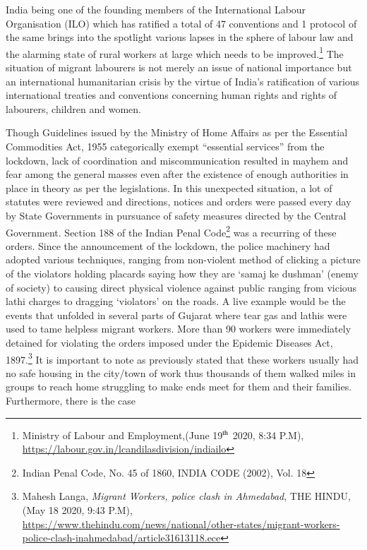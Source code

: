 \begin{multicols}{2}
\noi
India being one of the founding members of the International Labour Organisation (ILO)
which has ratified a total of 47 conventions and 1 protocol of the same brings into the
spotlight various lapses in the sphere of labour law and the alarming state of rural workers at
large which needs to be improved.\footnote{Ministry of Labour and Employment,(June 19$^{\rm th}$ 2020, 8:34 P.M), \url{https://labour.gov.in/lcandilasdivision/indiailo}} The situation of migrant labourers is not merely an issue
of national importance but an international humanitarian crisis by the virtue of India’s
ratification of various international treaties and conventions concerning human rights and
rights of labourers, children and women.

\noi
Though Guidelines issued by the Ministry of Home Affairs as per the Essential Commodities
Act, 1955 categorically exempt “essential services” from the lockdown, lack of coordination
and miscommunication resulted in mayhem and fear among the general masses even after the
existence of enough authorities in place in theory as per the legislations. In this unexpected
situation, a lot of statutes were reviewed and directions, notices and orders were passed every
day by State Governments in pursuance of safety measures directed by the Central Government. Section 188 of the Indian Penal Code\footnote{Indian Penal Code, No. 45 of 1860, INDIA CODE (2002), Vol. 18} was a recurring of these orders. Since
the announcement of the lockdown, the police machinery had adopted various techniques,
ranging from non-violent method of clicking a picture of the violators holding placards
saying how they are ‘samaj ke dushman’ (enemy of society) to causing direct physical
violence against public ranging from vicious lathi charges to dragging ‘violators’ on the
roads. A live example would be the events that unfolded in several parts of Gujarat where
tear gas and lathis were used to tame helpless migrant workers. More than 90 workers were
immediately detained for violating the orders imposed under the Epidemic Diseases Act,
1897.\footnote{Mahesh Langa, \textit{Migrant Workers, police clash in Ahmedabad}, THE HINDU, (May 18 2020, 9:43 P.M),\\
\url{https://www.thehindu.com/news/national/other-states/migrant-workers-police-clash-inahmedabad/article31613118.ece}} It is important to note as previously stated that these workers usually had no safe
housing in the city/town of work thus thousands of them walked miles in groups to reach
home struggling to make ends meet for them and their families. Furthermore, there is the case

\end{multicols}
